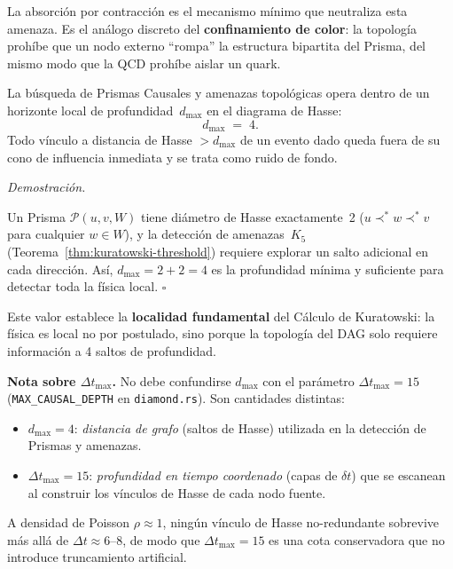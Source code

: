 \documentclass[11pt, a4paper, openany]{book}
\newcommand{\covers}{\prec^{\!*}}
\renewenvironment{proof}[1][Demostraci\'on]{%
  \par\noindent\textit{#1.}\quad
}{\hfill$\square$\par\medskip}
\begin{document}
\noindent
La absorci\'on por contracci\'on es el mecanismo m\'inimo que neutraliza
esta amenaza. Es el an\'alogo discreto del \textbf{confinamiento de
color}: la topolog\'ia proh\'ibe que un nodo externo ``rompa'' la
estructura bipartita del Prisma, del mismo modo que la QCD proh\'ibe
aislar un quark.

\begin{theorem}[Profundidad de Hasse $d_{\max} = 4$]
\label{thm:hasse-depth}
La b\'usqueda de Prismas Causales y amenazas topol\'ogicas opera dentro
de un horizonte local de profundidad~$d_{\max}$ en el diagrama de
Hasse:
\begin{equation}
  d_{\max} \;=\; 4.
  \label{eq:hasse-depth}
\end{equation}
Todo v\'inculo a distancia de Hasse $> d_{\max}$ de un evento dado
queda fuera de su cono de influencia inmediata y se trata como ruido
de fondo.
\end{theorem}

\begin{proof}
Un Prisma $\mathcal{P}(u,v,W)$ tiene di\'ametro de Hasse exactamente~2
($u \covers w \covers v$ para cualquier $w \in W$), y la
detecci\'on de amenazas~$K_5$ (Teorema~\ref{thm:kuratowski-threshold})
requiere explorar un salto adicional en cada direcci\'on.
As\'i, $d_{\max} = 2 + 2 = 4$ es la profundidad m\'inima y suficiente
para detectar toda la f\'isica local.
\end{proof}

\noindent
Este valor establece la \textbf{localidad fundamental} del C\'alculo de
Kuratowski: la f\'isica es local no por postulado, sino porque la
topolog\'ia del DAG solo requiere informaci\'on a 4 saltos de
profundidad.

\medskip\noindent
\textbf{Nota sobre $\Delta t_{\max}$.}
No debe confundirse $d_{\max}$ con el par\'ametro
$\Delta t_{\max} = 15$ (\texttt{MAX\_CAUSAL\_DEPTH} en
\texttt{diamond.rs}).  Son cantidades distintas:
\begin{itemize}
  \item $d_{\max} = 4$: \emph{distancia de grafo} (saltos de Hasse)
    utilizada en la detecci\'on de Prismas y amenazas.
  \item $\Delta t_{\max} = 15$: \emph{profundidad en tiempo coordenado}
    (capas de $\delta t$) que se escanean al construir los v\'inculos de
    Hasse de cada nodo fuente.
\end{itemize}
A densidad de Poisson $\rho \approx 1$, ning\'un v\'inculo de Hasse
no-redundante sobrevive m\'as all\'a de $\Delta t \approx 6$--8, de modo
que $\Delta t_{\max} = 15$ es una cota conservadora que no introduce
truncamiento artificial.
\end{document}
